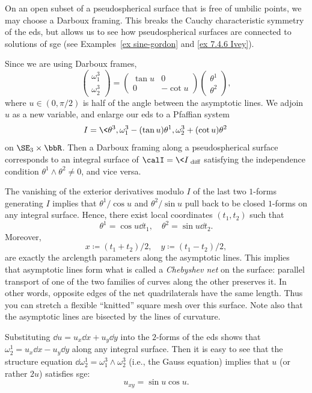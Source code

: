 On an open subset of a pseudospherical surface that is free of umbilic points, we may choose a Darboux framing. This breaks the Cauchy characteristic symmetry of the \gls{eds}, but allows us to see how pseudospherical surfaces are connected to solutions of \gls{sge} (see Examples~\ref{ex sine-gordon} and \ref{ex 7.4.6 Ivey}).

Since we are using Darboux frames,
\[\begin{pmatrix}
    \omega^3_1\\\omega^3_2
\end{pmatrix}=\begin{pmatrix}
    \tan u & 0\\
    0 & -\cot u
\end{pmatrix}\begin{pmatrix}
    \theta^1\\\theta^2
\end{pmatrix},\]
where $u\in (0,\pi/2)$ is half of the angle between the asymptotic lines. We adjoin $u$ as a new variable, and enlarge our \gls{eds} to a Pfaffian system 
\[I=\<\theta^3,\omega^3_1-(\tan u)\theta^1,\omega^3_2+(\cot u)\theta^2\>\]
on $\SE_3\times \bbR$. Then a Darboux framing along a pseudospherical surface corresponds to an integral surface of $\calI=\<I\>_{\mathrm{diff}}$ satisfying the independence condition $\theta^1\wedge\theta^2\neq 0$, and vice versa.

The vanishing of the exterior derivatives modulo $I$ of the last two $1$-forms generating $I$ implies that $\theta^1/\cos u$ and $\theta^2/\sin u$ pull back to be closed $1$-forms on any integral surface. Hence, there exist local coordinates $(t_1,t_2)$ such that 
\[\theta^1=\cos u\dd t_1,\quad \theta^2=\sin u\dd t_2.\]
Moreover, 
\[x\coloneqq (t_1+ t_2)/2,\quad y\coloneqq (t_1-t_2)/2,\] are exactly the arclength parameters along the asymptotic lines. This implies that asymptotic lines form what is called a \emph{Chebyshev net} on the surface: parallel transport of one of the two families of curves along the other preserves it. In other words, opposite edges of the net quadrilaterals have the same length. Thus you can stretch a flexible ``knitted'' square mesh over this surface. Note also that the asymptotic lines are bisected by the lines of curvature.

Substituting $\dd u=u_x\dd x+u_y\dd y$ into the $2$-forms of the \gls{eds} shows that $\omega_2^1=u_x\dd x-u_y\dd y$ along any integral surface. Then it is easy to see that the structure equation $\dd\omega^1_2=\omega^3_1\wedge\omega^3_2$ (i.e., the Gauss equation) implies that $u$ (or rather $2u$) satisfies \gls{sge}:
\[u_{xy}=\sin u\cos u.\]

